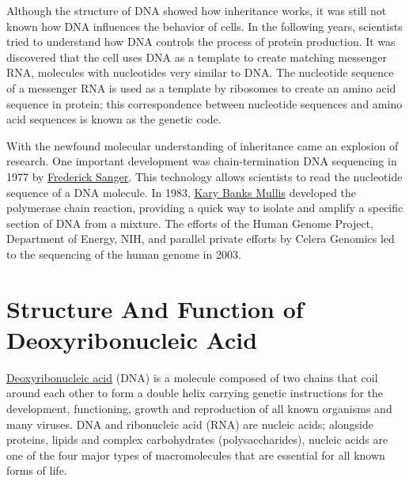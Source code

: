 Although the structure of DNA showed how inheritance works, it was still not known how DNA influences the behavior of cells. In the following years, scientists tried to understand how DNA controls the process of protein production. It was discovered that the cell uses DNA as a template to create matching messenger RNA, molecules with nucleotides very similar to DNA. The nucleotide sequence of a messenger RNA is used as a template by ribosomes to create an amino acid sequence in protein; this correspondence between nucleotide sequences and amino acid sequences is known as the genetic code.

With the newfound molecular understanding of inheritance came an explosion of research. One important development was chain-termination DNA sequencing in 1977 by \href{https://en.wikipedia.org/wiki/Frederick_Sanger}{Frederick Sanger}. This technology allows scientists to read the nucleotide sequence of a DNA molecule. In 1983, \href{https://en.wikipedia.org/wiki/Kary_Mullis}{Kary Banks Mullis} developed the polymerase chain reaction, providing a quick way to isolate and amplify a specific section of DNA from a mixture. The efforts of the Human Genome Project, Department of Energy, NIH, and parallel private efforts by Celera Genomics led to the sequencing of the human genome in 2003.

\hypertarget{structure-and-function-of-deoxyribonucleic-acid}{%
\section{Structure And Function of Deoxyribonucleic Acid}\label{structure-and-function-of-deoxyribonucleic-acid}}

\href{https://en.wikipedia.org/wiki/DNA}{Deoxyribonucleic acid} (DNA) is a molecule composed of two chains that coil around each other to form a double helix carrying genetic instructions for the development, functioning, growth and reproduction of all known organisms and many viruses. DNA and ribonucleic acid (RNA) are nucleic acids; alongside proteins, lipids and complex carbohydrates (polysaccharides), nucleic acids are one of the four major types of macromolecules that are essential for all known forms of life.



